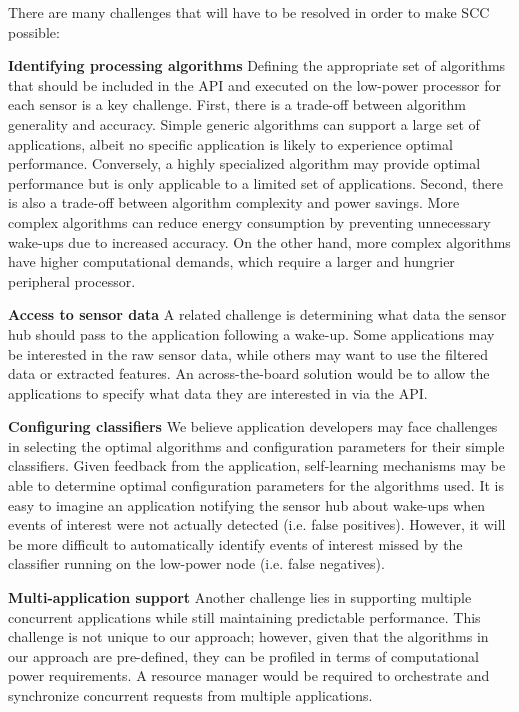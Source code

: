There are many challenges that will have to be resolved in order to
make SCC possible:

{\bf Identifying processing algorithms} Defining the appropriate
set of algorithms that should be included in the API and executed on
the low-power processor for each sensor is a key challenge. First,
there is a trade-off between algorithm generality and accuracy.
Simple generic algorithms can support a large set of
applications, albeit no specific application is likely to experience
optimal performance.  Conversely, a highly specialized algorithm may
provide optimal performance but is only applicable to a limited set of
applications.  Second, there is also a trade-off between algorithm
complexity and power savings.  More complex algorithms can reduce
energy consumption by preventing unnecessary wake-ups due to increased
accuracy. On the other hand, more complex algorithms have higher
computational demands, which require a larger and hungrier peripheral
processor.

{\bf Access to sensor data} A related challenge is determining what
data the sensor hub should pass to the application following a
wake-up. Some applications may be interested in the raw sensor data,
while others may want to use the filtered data or extracted features.
An across-the-board solution would be to allow the applications to
specify what data they are interested in via the API.

{\bf Configuring classifiers} We believe application developers may
face challenges in selecting the optimal algorithms and configuration
parameters for their simple classifiers.  Given feedback from the
application, self-learning mechanisms may be able to determine optimal
configuration parameters for the algorithms used.  It is easy to 
imagine an application notifying the
sensor hub about wake-ups when events of interest were not actually
detected (i.e. false positives).  However, it will be more difficult
to automatically identify events of interest missed by the classifier
running on the low-power node (i.e. false negatives).

{\bf Multi-application support} Another challenge lies in supporting
multiple concurrent applications while still maintaining predictable
performance.  This challenge is not unique to our approach; however,
given that the algorithms in our approach are pre-defined, they can be
profiled in terms of computational power requirements.  A resource
manager would be required to orchestrate and synchronize concurrent
requests from multiple applications.

